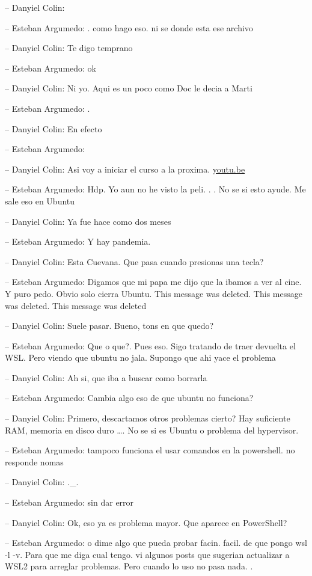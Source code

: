 -- Danyiel Colin:

-- Esteban Argumedo: . como hago eso. ni se donde esta ese archivo

-- Danyiel Colin: Te digo temprano

-- Esteban Argumedo: ok

-- Danyiel Colin: Ni yo. Aqui es un poco como Doc le decia a Marti

-- Esteban Argumedo: .

-- Danyiel Colin: En efecto

-- Esteban Argumedo:

-- Danyiel Colin: Asi voy a iniciar el curso a la proxima.
\href{https://youtu.be/d-G5gAThBWs}{youtu.be}

-- Esteban Argumedo: Hdp. Yo aun no he visto la peli. . . No se si esto
ayude. Me sale eso en Ubuntu

-- Danyiel Colin: Ya fue hace como dos meses

-- Esteban Argumedo: Y hay pandemia.

-- Danyiel Colin: Esta Cuevana. Que pasa cuando presionas una tecla?

-- Esteban Argumedo: Digamos que mi papa me dijo que la ibamos a ver al
cine. Y puro pedo. Obvio solo cierra Ubuntu. This message was deleted.
This message was deleted. This message was deleted

-- Danyiel Colin: Suele pasar. Bueno, tons en que quedo?

-- Esteban Argumedo: Que o que?. Pues eso. Sigo tratando de traer
devuelta el WSL. Pero viendo que ubuntu no jala. Supongo que ahi yace el
problema

-- Danyiel Colin: Ah si, que iba a buscar como borrarla

-- Esteban Argumedo: Cambia algo eso de que ubuntu no funciona?

-- Danyiel Colin: Primero, descartamos otros problemas cierto? Hay
suficiente RAM, memoria en disco duro \ldots. No se si es Ubuntu o
problema del hypervisor.

-- Esteban Argumedo: tampoco funciona el usar comandos en la powershell.
no responde nomas

-- Danyiel Colin: .\_.

-- Esteban Argumedo: sin dar error

-- Danyiel Colin: Ok, eso ya es problema mayor. Que aparece en
PowerShell?

-- Esteban Argumedo: o dime algo que pueda probar facin. facil. de que
pongo wsl -l -v. Para que me diga cual tengo. vi algunos posts que
sugerian actualizar a WSL2 para arreglar problemas. Pero cuando lo uso
no pasa nada. .

